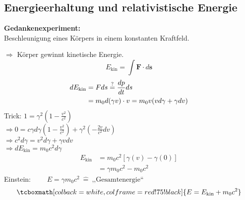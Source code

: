 \documentclass[titlepage,11pt,a4paper,ngerman]{report}
\newcommand{\tx}[1]{\textrm{#1}}
\renewcommand{\vec}[1]{\boldsymbol{#1}}
\newcommand{\rmbox}[1]{\tcboxmath[colback=white,colframe=red!75!black]{#1}}
\begin{document}
\subsection{Energieerhaltung und relativistische Energie}
\begin{minipage}{.5\linewidth}
	\textbf{Gedankenexperiment:}\\[5pt]
	Beschleunigung eines Körpers in einem konstanten Kraftfeld.
\end{minipage}
\begin{minipage}{.5\linewidth}
	\hspace{50pt}
\end{minipage}
$ \Rightarrow $ Körper gewinnt kinetische Energie.
\begin{equation*}
E_{\tx{kin}} = \int \vec{F} \cdot d\vec{s}
\end{equation*}
\begin{align*}
dE_{\tx{kin}} &= F ds \buildrel ? \over = \frac{dp}{dt} ds\\
&= m_0 d(\gamma v) \cdot v = m_0 v (v d \gamma + \gamma dv)
\end{align*}
Trick:
$ 1 = \gamma^2 \left( 1 - \frac{v^2}{c^2} \right) $\\
$ \Rightarrow 0 = c \gamma d \gamma \left(1 - \frac{v^2}{c^2}\right) + \gamma ^2 \left(- \frac{2v}{c^2} dv \right) $\\
$ \Rightarrow c^2 d \gamma = v^2 d\gamma + \gamma v dv $\\
$ \Rightarrow d E_{\tx{kin}} = m_0 c^2 d \gamma $
\begin{align*}
E_{\tx{kin}} &= m_0 c^2 \left[\gamma(v) - \gamma(0)\right]\\
&= \gamma m_0 c^2 - m_0 c^2
\end{align*}
Einstein: $ \qquad E = \gamma m_0 c^2 \ \widehat{ = }\ \tx{,,Gesamtenergie``} $
\begin{equation*}
\rmbox{E = E_{\tx{kin}} + m_0 c^2}
\end{equation*}
\end{document}
